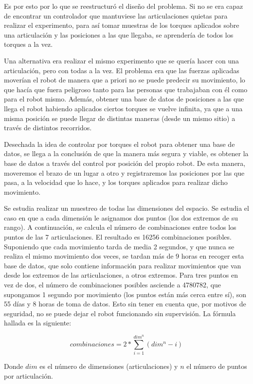 Es por esto por lo que se reestructuró el diseño del problema. Si no se era capaz de encontrar un controlador que mantuviese las articulaciones quietas para realizar el experimento, para así tomar muestras de los torques aplicados sobre una articulación y las posiciones a las que llegaba, se aprendería de todos los torques a la vez.

Una alternativa era realizar el mismo experimento que se quería hacer con una articulación, pero con todas a la vez. El problema era que las fuerzas aplicadas moverían el robot de manera que a priori no se puede predecir su movimiento, lo que hacía que fuera peligroso tanto para las personas que trabajaban con él como para el robot mismo. Además, obtener una base de datos de posiciones a las que llega el robot habiendo aplicados ciertos torques se vuelve infinita, ya que a una misma posición se puede llegar de distintas maneras (desde un mismo sitio) a través de distintos recorridos.

Desechada la idea de controlar por torques el robot para obtener una base de datos, se llega a la conclusión de que la manera más segura y viable, es obtener la base de datos a través del control por posición del propio robot. De esta manera, moveremos el brazo de un lugar a otro y registraremos las posiciones por las que pasa, a la velocidad que lo hace, y los torques aplicados para realizar dicho movimiento.

Se estudia realizar un muestreo de todas las dimensiones del espacio. Se estudia el caso en que a cada dimensión le asignamos dos puntos (los dos extremos de su rango). A continuación, se calcula el número de combinaciones entre todos los puntos de las 7 articulaciones. El resultado es 16256 combinaciones posibles. Suponiendo que cada movimiento tarda de media 2 segundos, y que nunca se realiza el mismo movimiento dos veces, se tardan más de 9 horas en recoger esta base de datos, que solo contiene información para realizar movimientos que van desde los extremos de las articulaciones, a otros extremos. Para tres puntos en vez de dos, el número de combinaciones posibles asciende a 4780782, que supongamos 1 segundo por movimiento (los puntos están más cerca entre sí), son 55 días y 8 horas de toma de datos. Esto sin tener en cuenta que, por motivos de seguridad, no se puede dejar el robot funcionando sin supervisión. La fórmula hallada es la siguiente:

$$ combinaciones = 2 * \sum_{i=1}^{dim^n}(dim^n-i) $$

Donde $dim$ es el número de dimensiones (articulaciones) y $n$ el número de puntos por articulación.

